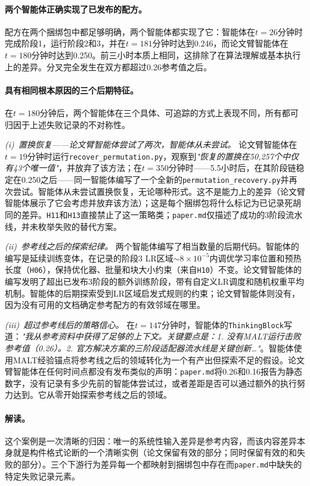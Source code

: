 \paragraph{两个智能体正确实现了已发布的配方。}
配方在两个捆绑包中都足够明确，两个智能体都实现了它：\ara{}智能体在$t = 26$分钟时完成阶段1，运行阶段2和3，并在$t = 181$分钟时达到0.246，而论文臂智能体在$t = 180$分钟时达到0.250。前三小时本质上相同，这排除了在算法理解或基本执行上的差异。分叉完全发生在双方都超过0.26参考值之后。

\paragraph{具有相同根本原因的三个后期特征。}
在$t = 180$分钟后，两个智能体在三个具体、可追踪的方式上表现不同，所有都可归因于上述失败记录的不对称性。

\emph{(i)~置换恢复——论文臂智能体尝试了两次，\ara{}智能体从未尝试。}
论文臂智能体在$t = 19$分钟时运行\texttt{recover\_permutation.py}，观察到\emph{"恢复的置换在50{,}257个中仅有43个唯一值"}，并放弃了该方法；在$t = 350$分钟时——5.5小时后，在其阶段链稳定在0.250之后——同一智能体编写了一个全新的\texttt{permutation\_recovery.py}并再次尝试。\ara{}智能体从未尝试置换恢复，无论哪种形式。这不是能力上的差异（论文臂智能体展示了它会考虑并放弃该方法）；这是每个捆绑包将什么标记为已记录死胡同的差异。\texttt{H11}和\texttt{H13}直接禁止了这一策略类；\texttt{paper.md}仅描述了成功的3阶段流水线，并未枚举失败的替代方案。

\emph{(ii)~参考线之后的探索纪律。}
两个智能体编写了相当数量的后期代码。\ara{}智能体的编写是延续训练变体，在记录的阶段3 LR区域$\sim8\times 10^{-5}$内调优学习率位置和预热长度（\texttt{H06}），保持优化器、批量和块大小约束（来自\texttt{H10}）不变。论文臂智能体的编写发明了超出已发布3阶段的额外训练阶段，带有自定义LR调度和随机权重平均机制。\ara{}智能体的后期探索受到LR区域启发式规则的约束；论文臂智能体则没有，因为没有可用的文档确定参考配方的有效邻域在哪里。

\emph{(iii)~超过参考线后的策略信心。}
在$t = 147$分钟时，\ara{}智能体的\texttt{ThinkingBlock}写道：\emph{"我从参考资料中获得了足够的上下文。关键要点是：1. 没有MALT运行击败参考值（0.26）。2. 官方解决方案的三阶段适配器流水线是关键创新…"}。智能体使用MALT经验锚点将参考线之后的领域转化为一个有产出但探索不足的假设。论文臂智能体在任何时间点都没有发布类似的声明：\texttt{paper.md}将0.26和0.16报告为静态数字，没有记录有多少先前的智能体尝试过，或者差距是否可以通过额外的执行努力达到。它从零开始探索参考线之后的领域。

\paragraph{解读。}
这个案例是一次清晰的归因：唯一的系统性输入差异是参考内容，而该内容差异本身就是构件格式论断的一个清晰实例（论文保留有效的部分；\ara{}同时保留有效的和失败的部分）。三个下游行为差异每一个都映射到\ara{}捆绑包中存在而\texttt{paper.md}中缺失的特定失败记录元素。

